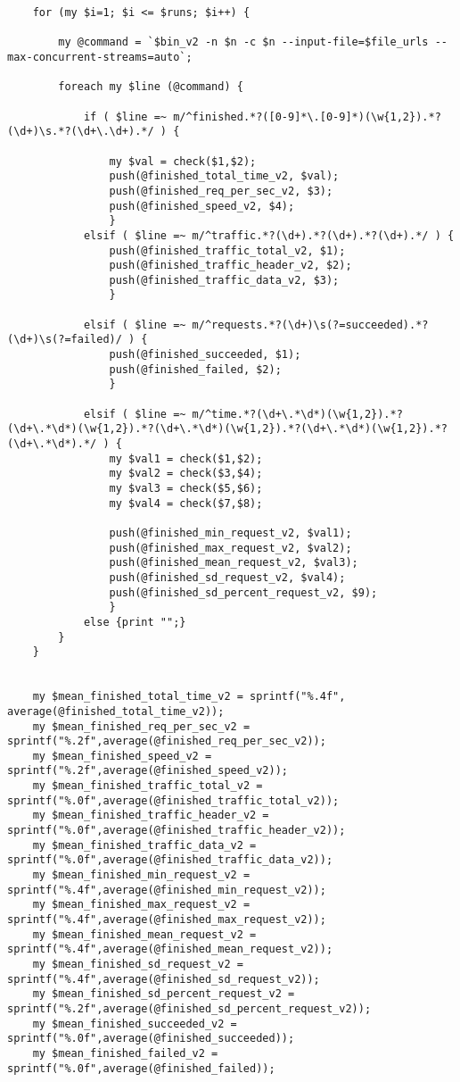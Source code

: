 \begin{lstlisting}
	for (my $i=1; $i <= $runs; $i++) {
		
		my @command = `$bin_v2 -n $n -c $n --input-file=$file_urls --max-concurrent-streams=auto`;				
	
		foreach my $line (@command) {

			if ( $line =~ m/^finished.*?([0-9]*\.[0-9]*)(\w{1,2}).*?(\d+)\s.*?(\d+\.\d+).*/ ) {
				
				my $val = check($1,$2);	
				push(@finished_total_time_v2, $val);
				push(@finished_req_per_sec_v2, $3);
				push(@finished_speed_v2, $4);
				}
			elsif ( $line =~ m/^traffic.*?(\d+).*?(\d+).*?(\d+).*/ ) {	
				push(@finished_traffic_total_v2, $1);
                push(@finished_traffic_header_v2, $2);
                push(@finished_traffic_data_v2, $3);
				}
				
			elsif ( $line =~ m/^requests.*?(\d+)\s(?=succeeded).*?(\d+)\s(?=failed)/ ) {
				push(@finished_succeeded, $1);
				push(@finished_failed, $2);
				}	
					
			elsif ( $line =~ m/^time.*?(\d+\.*\d*)(\w{1,2}).*?(\d+\.*\d*)(\w{1,2}).*?(\d+\.*\d*)(\w{1,2}).*?(\d+\.*\d*)(\w{1,2}).*?(\d+\.*\d*).*/ ) {
				my $val1 = check($1,$2);
				my $val2 = check($3,$4);
				my $val3 = check($5,$6);
				my $val4 = check($7,$8);

                push(@finished_min_request_v2, $val1);
				push(@finished_max_request_v2, $val2);
				push(@finished_mean_request_v2, $val3);
				push(@finished_sd_request_v2, $val4);
				push(@finished_sd_percent_request_v2, $9);
				}
			else {print "";}
		}
	}	


	my $mean_finished_total_time_v2 = sprintf("%.4f", average(@finished_total_time_v2));
	my $mean_finished_req_per_sec_v2 = sprintf("%.2f",average(@finished_req_per_sec_v2));
	my $mean_finished_speed_v2 = sprintf("%.2f",average(@finished_speed_v2));
	my $mean_finished_traffic_total_v2 = sprintf("%.0f",average(@finished_traffic_total_v2));
	my $mean_finished_traffic_header_v2 = sprintf("%.0f",average(@finished_traffic_header_v2));
	my $mean_finished_traffic_data_v2 = sprintf("%.0f",average(@finished_traffic_data_v2));
	my $mean_finished_min_request_v2 = sprintf("%.4f",average(@finished_min_request_v2));
	my $mean_finished_max_request_v2 = sprintf("%.4f",average(@finished_max_request_v2));
	my $mean_finished_mean_request_v2 = sprintf("%.4f",average(@finished_mean_request_v2));
	my $mean_finished_sd_request_v2 = sprintf("%.4f",average(@finished_sd_request_v2));
	my $mean_finished_sd_percent_request_v2 = sprintf("%.2f",average(@finished_sd_percent_request_v2));
	my $mean_finished_succeeded_v2 = sprintf("%.0f",average(@finished_succeeded));
	my $mean_finished_failed_v2 = sprintf("%.0f",average(@finished_failed));
	

\end{lstlisting}
